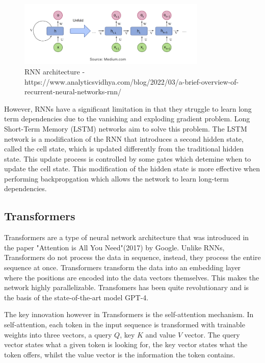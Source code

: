 \documentclass[11pt]{article}
\begin{document}
\begin{figure}[h]
\centering
\includegraphics[width=0.8\textwidth]{rnn.png}
\caption{RNN architecture - https://www.analyticsvidhya.com/blog/2022/03/a-brief-overview-of-recurrent-neural-networks-rnn/}
\end{figure}

However, RNNs have a significant limitation in that they struggle to learn long term dependencies due to the vanishing and exploding gradient problem. Long Short-Term Memory (LSTM) networks  aim to solve this problem. The LSTM network is a modification of the RNN that introduces a second hidden state, called the cell state, which is updated differently from the traditional hidden state. This update process is controlled by some gates which detemine when to update the cell state. This modification of the hidden state is more effective when performing backpropgation which allows the network to learn long-term dependencies.

\subsection{Transformers}

Transformers are a type of neural network architecture that was introduced in the paper "Attention is All You Need"(2017) by Google. Unlike RNNs, Transformers do not process the data in sequence, instead, they process the entire sequence at once. Transformers transform the data into an embedding layer where the positions are encoded into the data vectors themselves. This makes the network highly parallelizable. Transfomers has been quite revolutionary and is the basis of the state-of-the-art model GPT-4.

The key innovation however in Transformers is the self-attention mechanism. In self-attention, each token in the input sequence is transformed with trainable weights into three vectors, a query $Q$, key $K$ and value $V$ vector. The query vector states what a given token is looking for, the key vector states what the token offers, whilst the value vector is the information the token contains.
\end{document}
